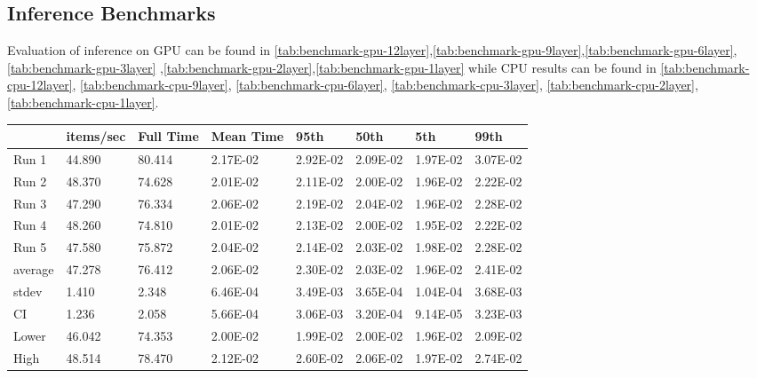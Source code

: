 \subsection{Inference Benchmarks}
\label{sec:inference-benchmarks}
Evaluation of inference on GPU can be found in \ref{tab:benchmark-gpu-12layer},\ref{tab:benchmark-gpu-9layer},\ref{tab:benchmark-gpu-6layer},\ref{tab:benchmark-gpu-3layer} ,\ref{tab:benchmark-gpu-2layer},\ref{tab:benchmark-gpu-1layer} while CPU results can be found in \ref{tab:benchmark-cpu-12layer}, \ref{tab:benchmark-cpu-9layer}, \ref{tab:benchmark-cpu-6layer}, \ref{tab:benchmark-cpu-3layer}, \ref{tab:benchmark-cpu-2layer}, \ref{tab:benchmark-cpu-1layer}.  

\begin{table*}[!ht]
    \centering
    \begin{tabular}{|l|l|l|l|l|l|l|l|}
    \hline
          & items/sec & Full Time & Mean Time & 95th & 50th & 5th & 99th \\ \hline
        Run 1 & 44.890 & 80.414 & 2.17E-02 & 2.92E-02 & 2.09E-02 & 1.97E-02 & 3.07E-02 \\ \hline
        Run 2 & 48.370 & 74.628 & 2.01E-02 & 2.11E-02 & 2.00E-02 & 1.96E-02 & 2.22E-02 \\ \hline
        Run 3 & 47.290 & 76.334 & 2.06E-02 & 2.19E-02 & 2.04E-02 & 1.96E-02 & 2.28E-02 \\ \hline
        Run 4 & 48.260 & 74.810 & 2.01E-02 & 2.13E-02 & 2.00E-02 & 1.95E-02 & 2.22E-02 \\ \hline
        Run 5 & 47.580 & 75.872 & 2.04E-02 & 2.14E-02 & 2.03E-02 & 1.98E-02 & 2.28E-02 \\ \hline
        average & 47.278 & 76.412 & 2.06E-02 & 2.30E-02 & 2.03E-02 & 1.96E-02 & 2.41E-02 \\ \hline
        stdev & 1.410 & 2.348 & 6.46E-04 & 3.49E-03 & 3.65E-04 & 1.04E-04 & 3.68E-03 \\ \hline
        CI & 1.236 & 2.058 & 5.66E-04 & 3.06E-03 & 3.20E-04 & 9.14E-05 & 3.23E-03 \\ \hline
        Lower & 46.042 & 74.353 & 2.00E-02 & 1.99E-02 & 2.00E-02 & 1.96E-02 & 2.09E-02 \\ \hline
        High & 48.514 & 78.470 & 2.12E-02 & 2.60E-02 & 2.06E-02 & 1.97E-02 & 2.74E-02 \\ \hline
    \end{tabular}
    \caption{Inference Benchmark for 12-layer Query encoder on a CPU using ONNX}
    \label{tab:benchmark-cpu-12layer}
\end{table*}

